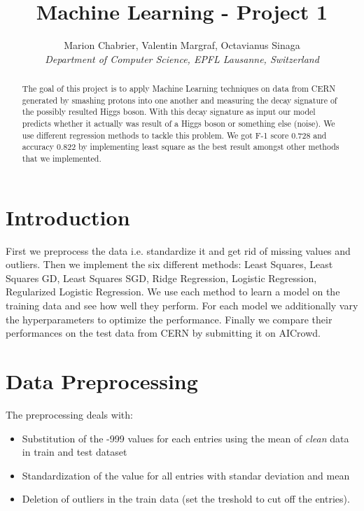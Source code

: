 \documentclass[10pt,conference,compsocconf]{IEEEtran}
\begin{document}
\title{Machine Learning - Project 1}

\author{
  Marion Chabrier, Valentin Margraf, Octavianus Sinaga\\
  \textit{Department of Computer Science, EPFL Lausanne, Switzerland}
}

\maketitle

\begin{abstract}
The goal of this project is to apply Machine Learning techniques on data from CERN generated by smashing protons into one another and measuring the decay signature of the possibly resulted Higgs boson. With this decay signature as input our model predicts whether it actually was result of a Higgs boson or something else (noise). We use different regression methods to tackle this problem. We got F-1 score 0.728 and accuracy 0.822 by implementing least square as the best result amongst other methods that we implemented.
\end{abstract}

\section{Introduction}
First we preprocess the data i.e. standardize it and get rid of missing values and outliers.
Then we implement the six different methods: Least Squares, Least Squares GD, Least Squares SGD, Ridge Regression, Logistic Regression, Regularized Logistic Regression. We use each method to learn a model on the training data and see how well they perform. For each model we additionally vary the hyperparameters to optimize the performance. Finally we compare their performances on the test data from CERN by submitting it on AICrowd.



\section{Data Preprocessing}
\label{sec:prepro}
The preprocessing deals with:
\begin{itemize}
	\item Substitution of the -999 values for each entries using the mean of \textit{clean} data in train and test dataset
	\item Standardization of the value for all entries with standar deviation and mean
	\item Deletion of outliers in the train data (set the treshold to cut off the entries).
\end{itemize}
\end{document}
